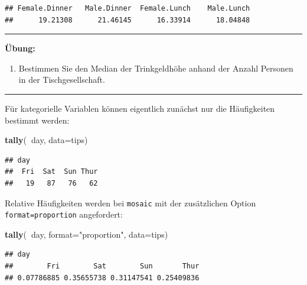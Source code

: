 \documentclass[12pt,ngerman,paper=a4,pagesize,DIV=13]{scrreprt}
\newenvironment{Shaded}{\begin{snugshade}}{\end{snugshade}}
\newcommand{\DataTypeTok}[1]{\textcolor[rgb]{0.13,0.29,0.53}{#1}}
\newcommand{\KeywordTok}[1]{\textcolor[rgb]{0.13,0.29,0.53}{\textbf{#1}}}
\newcommand{\NormalTok}[1]{#1}
\newcommand{\OperatorTok}[1]{\textcolor[rgb]{0.81,0.36,0.00}{\textbf{#1}}}
\newcommand{\StringTok}[1]{\textcolor[rgb]{0.31,0.60,0.02}{#1}}
\providecommand{\tightlist}{%
  \setlength{\itemsep}{0pt}\setlength{\parskip}{0pt}}
\begin{document}
\begin{verbatim}
## Female.Dinner   Male.Dinner  Female.Lunch    Male.Lunch 
##      19.21308      21.46145      16.33914      18.04848
\end{verbatim}

\begin{center}\rule{0.5\linewidth}{\linethickness}\end{center}

\textbf{Übung:}

\begin{enumerate}
\def\labelenumi{\arabic{enumi}.}
\setcounter{enumi}{6}
\tightlist
\item
  Bestimmen Sie den Median der Trinkgeldhöhe anhand der Anzahl Personen
  in der Tischgesellschaft.
\end{enumerate}

\begin{center}\rule{0.5\linewidth}{\linethickness}\end{center}

Für kategorielle Variablen können eigentlich zunächst nur die
Häufigkeiten bestimmt werden:

\begin{Shaded}
\begin{Highlighting}[]
\KeywordTok{tally}\NormalTok{(}\OperatorTok{~}\NormalTok{day, }\DataTypeTok{data=}\NormalTok{tips)}
\end{Highlighting}
\end{Shaded}

\begin{verbatim}
## day
##  Fri  Sat  Sun Thur 
##   19   87   76   62
\end{verbatim}

Relative Häufigkeiten werden bei \texttt{mosaic} mit der zusätzlichen
Option \texttt{format=\textquotesingle{}proportion\textquotesingle{}}
angefordert:

\begin{Shaded}
\begin{Highlighting}[]
\KeywordTok{tally}\NormalTok{(}\OperatorTok{~}\NormalTok{day, }\DataTypeTok{format=}\StringTok{"proportion"}\NormalTok{, }\DataTypeTok{data=}\NormalTok{tips)}
\end{Highlighting}
\end{Shaded}

\begin{verbatim}
## day
##        Fri        Sat        Sun       Thur 
## 0.07786885 0.35655738 0.31147541 0.25409836
\end{verbatim}
\end{document}
